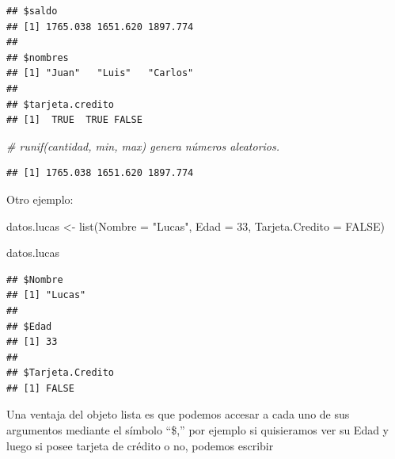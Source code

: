 \documentclass[
  12pt,
]{book}
\newenvironment{Shaded}{\begin{snugshade}}{\end{snugshade}}
\newcommand{\AttributeTok}[1]{\textcolor[rgb]{0.77,0.63,0.00}{#1}}
\newcommand{\CommentTok}[1]{\textcolor[rgb]{0.56,0.35,0.01}{\textit{#1}}}
\newcommand{\ConstantTok}[1]{\textcolor[rgb]{0.00,0.00,0.00}{#1}}
\newcommand{\DecValTok}[1]{\textcolor[rgb]{0.00,0.00,0.81}{#1}}
\newcommand{\FunctionTok}[1]{\textcolor[rgb]{0.00,0.00,0.00}{#1}}
\newcommand{\NormalTok}[1]{#1}
\newcommand{\OtherTok}[1]{\textcolor[rgb]{0.56,0.35,0.01}{#1}}
\newcommand{\SpecialCharTok}[1]{\textcolor[rgb]{0.00,0.00,0.00}{#1}}
\newcommand{\StringTok}[1]{\textcolor[rgb]{0.31,0.60,0.02}{#1}}
\begin{document}
\begin{verbatim}
## $saldo
## [1] 1765.038 1651.620 1897.774
## 
## $nombres
## [1] "Juan"   "Luis"   "Carlos"
## 
## $tarjeta.credito
## [1]  TRUE  TRUE FALSE
\end{verbatim}

\begin{Shaded}
\begin{Highlighting}[]
\CommentTok{\# runif(cantidad, min, max) genera números aleatorios.}
\end{Highlighting}
\end{Shaded}

\begin{Shaded}
\end{Shaded}

\begin{verbatim}
## [1] 1765.038 1651.620 1897.774
\end{verbatim}

Otro ejemplo:

\begin{Shaded}
\begin{Highlighting}[]
\NormalTok{datos.lucas }\OtherTok{\textless{}{-}} \FunctionTok{list}\NormalTok{(}\AttributeTok{Nombre =} \StringTok{"Lucas"}\NormalTok{, }\AttributeTok{Edad =} \DecValTok{33}\NormalTok{, }\AttributeTok{Tarjeta.Credito =} \ConstantTok{FALSE}\NormalTok{)}

\NormalTok{datos.lucas}
\end{Highlighting}
\end{Shaded}

\begin{verbatim}
## $Nombre
## [1] "Lucas"
## 
## $Edad
## [1] 33
## 
## $Tarjeta.Credito
## [1] FALSE
\end{verbatim}

Una ventaja del objeto lista es que podemos accesar a cada uno de sus argumentos mediante el símbolo ``\$,'' por ejemplo si quisieramos ver su Edad y luego si posee tarjeta de crédito o no, podemos escribir

\begin{Shaded}
\end{Shaded}
\end{document}
